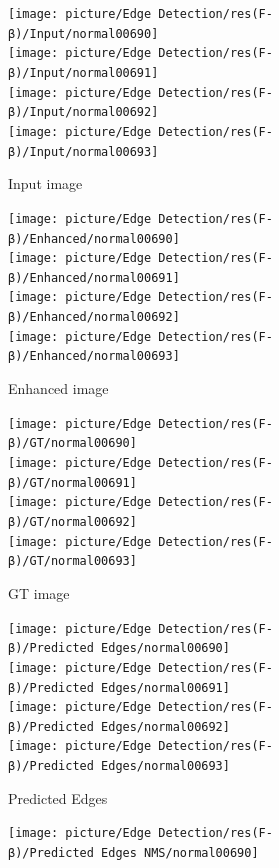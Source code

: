 \documentclass[a4paper]{ctexart}
\begin{document}
	\begin{figure}[htbp]
		\centering
		\begin{subfigure}{0.16\textwidth}
			\texttt{[image: picture/Edge Detection/res(F-β)/Input/normal00690]} \\
			\texttt{[image: picture/Edge Detection/res(F-β)/Input/normal00691]} \\
			\texttt{[image: picture/Edge Detection/res(F-β)/Input/normal00692]} \\
			\texttt{[image: picture/Edge Detection/res(F-β)/Input/normal00693]}
			\caption{Input image}
		\end{subfigure}
		\begin{subfigure}{0.16\textwidth}
			\texttt{[image: picture/Edge Detection/res(F-β)/Enhanced/normal00690]} \\
			\texttt{[image: picture/Edge Detection/res(F-β)/Enhanced/normal00691]} \\
			\texttt{[image: picture/Edge Detection/res(F-β)/Enhanced/normal00692]} \\
			\texttt{[image: picture/Edge Detection/res(F-β)/Enhanced/normal00693]}
			\caption{Enhanced image}
		\end{subfigure}
		\begin{subfigure}{0.16\textwidth}
			\texttt{[image: picture/Edge Detection/res(F-β)/GT/normal00690]} \\
			\texttt{[image: picture/Edge Detection/res(F-β)/GT/normal00691]} \\
			\texttt{[image: picture/Edge Detection/res(F-β)/GT/normal00692]} \\
			\texttt{[image: picture/Edge Detection/res(F-β)/GT/normal00693]}
			\caption{GT image}
		\end{subfigure}
		\begin{subfigure}{0.16\textwidth}
			\texttt{[image: picture/Edge Detection/res(F-β)/Predicted Edges/normal00690]} \\
			\texttt{[image: picture/Edge Detection/res(F-β)/Predicted Edges/normal00691]} \\
			\texttt{[image: picture/Edge Detection/res(F-β)/Predicted Edges/normal00692]} \\
			\texttt{[image: picture/Edge Detection/res(F-β)/Predicted Edges/normal00693]}
			\caption{Predicted Edges}
		\end{subfigure}
		\begin{subfigure}{0.16\textwidth}
			\texttt{[image: picture/Edge Detection/res(F-β)/Predicted Edges NMS/normal00690]} \\

\end{subfigure}
\end{figure}
\end{document}
